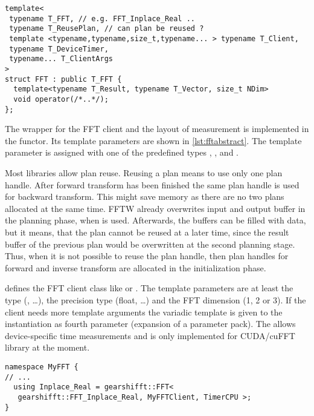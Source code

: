 \begin{lstlisting}[caption={FFT wrapper class},label={lst:fftabstract}]
template<
 typename T_FFT, // e.g. FFT_Inplace_Real ..
 typename T_ReusePlan, // can plan be reused ?
 template <typename,typename,size_t,typename... > typename T_Client,
 typename T_DeviceTimer,
 typename... T_ClientArgs
>
struct FFT : public T_FFT {
  template<typename T_Result, typename T_Vector, size_t NDim>
  void operator(/*..*/);
};
\end{lstlisting}

The wrapper for the FFT client and the layout of measurement is implemented in the  functor.
Its template parameters are shown in \cref{lst:fftabstract}. 
The template parameter  is assigned with one of the predefined types , ,  and .

Most libraries allow plan reuse.
Reusing a plan means to use only one plan handle. After forward transform has been finished the same plan handle is used for backward transform.
This might save memory as there are no two plans allocated at the same time. FFTW already overwrites input and output buffer in the planning phase, when  is used. Afterwards, the buffers can be filled with data, but it means, that the plan cannot be reused at a later time, since the result buffer of the previous plan would be overwritten at the second planning stage.
Thus, when it is not possible to reuse the plan handle, then plan handles for forward and inverse transform are allocated in the initialization phase.

 defines the FFT client class like  or .
The template parameters are at least the  type (, \ldots), the precision type (float, \ldots) and the FFT dimension (1, 2 or 3). 
If the client needs more template arguments the variadic template  is given to the  instantiation as fourth parameter (expansion of a parameter pack).
The  allows device-specific time measurements and is only implemented for CUDA/cuFFT library at the moment.

\begin{lstlisting}[caption={Define FFT client types for corresponding FFTs},label={lst:implfftusing}]
namespace MyFFT { 
// ...
  using Inplace_Real = gearshifft::FFT<
   gearshifft::FFT_Inplace_Real, MyFFTClient, TimerCPU >;
}
\end{lstlisting}

